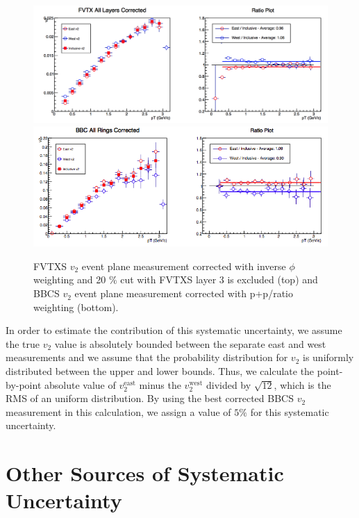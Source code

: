 \begin{figure}[!h]
\begin{center}
\includegraphics[width=0.75\linewidth]{figs/fvtx_corrected.png}
\includegraphics[width=0.75\linewidth]{figs/bbc_pp_correction.png}
\caption{ FVTXS $v_2$ event plane measurement corrected with inverse $\phi$ weighting and 20 $\%$ cut with FVTXS layer 3 is excluded (top) and BBCS $v_2$ event plane measurement corrected with p+p/\pau ratio weighting (bottom).}
\label{fig:fvtx_corrected_best}
\end{center}
\end{figure}

In order to estimate the contribution of this systematic uncertainty, we assume the true $v_2$ value is absolutely bounded between the separate east and west measurements and we assume that the probability distribution for $v_2$ is uniformly distributed between the upper and lower bounds. Thus, we calculate the point-by-point absolute value of $v_2^{\textrm{east}}$ minus the $v_2^{\textrm{west}}$ divided by $\sqrt{12}$, which is the RMS of an uniform distribution. By using the best corrected BBCS $v_2$ measurement in this calculation, we assign a value of $5\%$ for this systematic uncertainty.


\section{Other Sources of Systematic Uncertainty}
